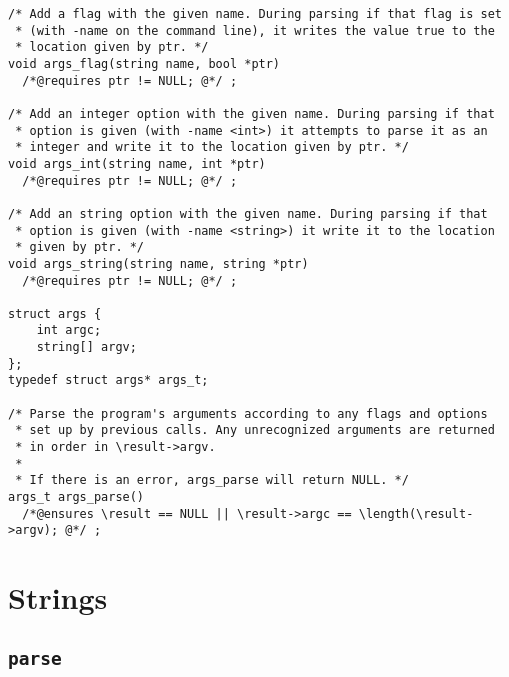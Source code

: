 \documentclass[11pt]{article}
\begin{document}
\begin{small}
\begin{verbatim}
/* Add a flag with the given name. During parsing if that flag is set
 * (with -name on the command line), it writes the value true to the
 * location given by ptr. */
void args_flag(string name, bool *ptr)
  /*@requires ptr != NULL; @*/ ;

/* Add an integer option with the given name. During parsing if that
 * option is given (with -name <int>) it attempts to parse it as an
 * integer and write it to the location given by ptr. */
void args_int(string name, int *ptr)
  /*@requires ptr != NULL; @*/ ;

/* Add an string option with the given name. During parsing if that
 * option is given (with -name <string>) it write it to the location
 * given by ptr. */
void args_string(string name, string *ptr)
  /*@requires ptr != NULL; @*/ ;

struct args {
    int argc;
    string[] argv;
};
typedef struct args* args_t;

/* Parse the program's arguments according to any flags and options
 * set up by previous calls. Any unrecognized arguments are returned
 * in order in \result->argv.
 *
 * If there is an error, args_parse will return NULL. */
args_t args_parse()
  /*@ensures \result == NULL || \result->argc == \length(\result->argv); @*/ ;
\end{verbatim}
\end{small}

\section{Strings}

\subsection{\tt parse}
\end{document}
